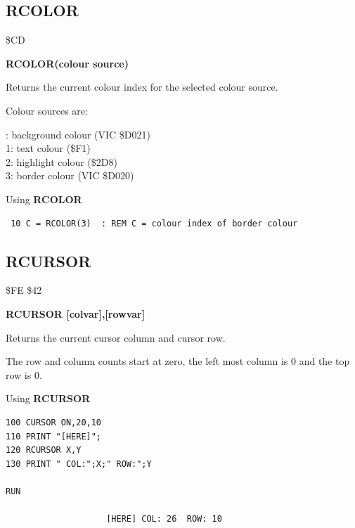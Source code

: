 \subsection{RCOLOR}
\begin{description}[leftmargin=2cm,style=nextline]
\item [Token:] \$CD
\item [Format:] {\bf RCOLOR(colour source)}
\item [Usage:]  Returns the current colour index for the
                selected colour source.

                Colour sources are:

{: background colour (VIC \$D021) \\
                1: text colour (\$F1) \\
                2: highlight colour (\$2D8) \\
                3: border colour (VIC \$D020)
}
\item [Example:] Using {\bf RCOLOR}

\begin{tcolorbox}[colback=black,coltext=white]
\verbatimfont{\codefont}
\begin{verbatim}
 10 C = RCOLOR(3)  : REM C = colour index of border colour
\end{verbatim}
\end{tcolorbox}
\end{description}


\newpage
\subsection{RCURSOR}
\begin{description}[leftmargin=2cm,style=nextline]
\item [Token:] \$FE \$42
\item [Format:] {\bf RCURSOR [colvar],[rowvar]}
\item [Usage:]  Returns the current cursor column and cursor row.

\item [Remarks:] The row and column counts start at zero,
                 the left most column is 0 and the top row is 0.

\item [Example:] Using {\bf RCURSOR}

\begin{tcolorbox}[colback=black,coltext=white]
\verbatimfont{\codefont}
\begin{verbatim}
100 CURSOR ON,20,10
110 PRINT "[HERE]";
120 RCURSOR X,Y
130 PRINT " COL:";X;" ROW:";Y

RUN

                    [HERE] COL: 26  ROW: 10
\end{verbatim}
\end{tcolorbox}
\end{description}

